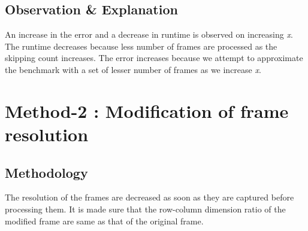 \documentclass[a4paper]{article}
\begin{document}
\subsection*{Observation \& Explanation}
An increase in the error and a decrease in runtime is observed on increasing \textit{x}. The runtime decreases because less number of frames are processed as the skipping count increases. The error increases because we attempt to approximate the benchmark with a set of lesser number of frames as we increase \textit{x}.
\section*{Method-2 :  Modification of frame resolution }
\subsection*{Methodology}
The resolution of the frames are decreased as soon as they are captured before processing them. It is made sure that the row-column dimension ratio of the modified frame are same as that of the original frame.
\end{document}
